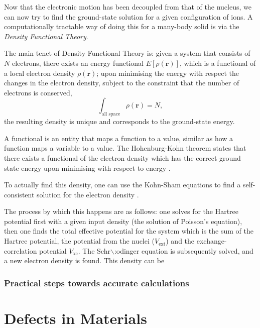 \documentclass[11pt]{article}
\begin{document}
Now that the electronic motion has been decoupled from that of the nucleus, we can now try to
find the ground-state solution for a given configuration of ions. A computationally tractable
way of doing this for a many-body solid is via the \emph{Density Functional Theory}. 

The main tenet of Density Functional Theory is: given a system that consists of \(N\) electrons,
there exists an energy functional \(E[\rho(\mathbf{r})]\), which is a functional of a local
electron density \(\rho(\mathbf{r})\); upon minimising the energy with respect the changes in the
electron density, subject to the constraint that the number of electrons is conserved, $$
\int_{\text{all space}} \rho(\mathbf{r}) = N, $$ the resulting density is unique and
corresponds to the ground-state energy.

A functional is an entity that maps a function to a value, similar as how a function maps a
variable to a value. The Hohenburg-Kohn theorem states that there exists a functional of the
electron density which has the correct ground state energy upon minimising with respect to
energy \cite{hohenburg64_inhomog_electron_gas}. 

To actually find this density, one can use the Kohn-Sham equations to find a self-consistent
solution for the electron density \cite{kohn65_self_cons_eq}. 

The process by which this happens are as follows: one solves for the Hartree potential first with a
given input density (the solution of Poisson's equation), then one finds the total effective potential
for the system which is the sum of the Hartree potential, the potential from the nuclei
(\(V_{\text{ext}}\)) and the exchange-correlation potential \(V_{\text{xc}}\). The Schr$\backslash$:odinger
equation is subsequently solved, and a new electron density is found. This density can be





\subsubsection{Practical steps towards accurate calculations}
\label{sec:org69d277b}



\section{Defects in Materials}
\label{sec:orgfa6b262}
\end{document}
